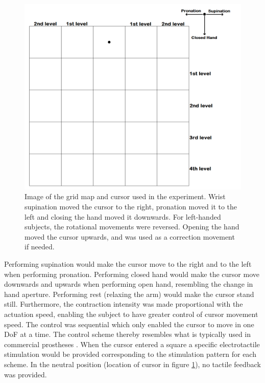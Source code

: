 \begin{figure}[H]                 
	\includegraphics[width=1\textwidth]{figures/gridmap2}  
	\caption{Image of the grid map and cursor used in the experiment. Wrist supination moved the cursor to the right, pronation moved it to the left and closing the hand moved it downwards. For left-handed subjects, the rotational movements were reversed. Opening the hand moved the cursor upwards, and was used as a correction movement if needed.}
	\label{fig:pa:gridmap} 
\end{figure}

Performing supination would make the cursor move to the right and to the left when performing pronation. Performing closed hand would make the cursor move downwards and upwards when performing open hand, resembling the change in hand aperture. Performing rest (relaxing the arm) would make the cursor stand still. Furthermore, the contraction intensity was made proportional with the actuation speed, enabling the subject to have greater control of cursor movement speed. The control was sequential which only enabled the cursor to move in one DoF at a time. The control scheme thereby resembles what is typically used in commercial prostheses \cite{Atzori2015}. When the cursor entered a square a specific electrotactile stimulation would be provided corresponding to the stimulation pattern for each scheme. In the neutral position (location of cursor in figure \ref{fig:pa:gridmap}), no tactile feedback was provided.     


